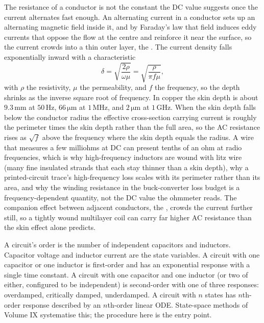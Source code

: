 \begin{mastery}
The resistance of a conductor is not the constant the DC value suggests once the
current alternates fast enough. An alternating current in a conductor sets up an
alternating magnetic field inside it, and by Faraday's law that field induces
eddy currents that oppose the flow at the centre and reinforce it near the
surface, so the current crowds into a thin outer layer, the . The current density falls exponentially inward with a characteristic
\[
\delta = \sqrt{\frac{2\rho}{\omega\mu}}
= \sqrt{\frac{\rho}{\pi f\mu}},
\]
with $\rho$ the resistivity, $\mu$ the permeability, and $f$ the frequency, so
the depth shrinks as the inverse square root of frequency. In copper the skin
depth is about $9.3\,\si{\milli\meter}$ at $50\,\si{\hertz}$, $66\,\si{\micro
\meter}$ at $1\,\si{\mega\hertz}$, and $2\,\si{\micro\meter}$ at
$1\,\si{\giga\hertz}$. When the skin depth falls below the conductor radius the
effective cross-section carrying current is roughly the perimeter times the skin
depth rather than the full area, so the AC resistance rises as $\sqrt{f}$ above
the frequency where the skin depth equals the radius. A wire that measures a few
milliohms at DC can present tenths of an ohm at radio frequencies, which is why
high-frequency inductors are wound with litz wire (many fine insulated strands
that each stay thinner than a skin depth), why a printed-circuit trace's
high-frequency loss scales with its perimeter rather than its area, and why the
winding resistance in the buck-converter loss budget is a frequency-dependent
quantity, not the DC value the ohmmeter reads. The companion effect between
adjacent conductors, the , crowds the current further
still, so a tightly wound multilayer coil can carry far higher AC resistance
than the skin effect alone predicts.
\end{mastery}

\begin{principle}
A circuit's order is the number of independent capacitors and
inductors. Capacitor voltage and inductor current are the state
variables. A circuit with one capacitor or one inductor is first-order
and has an exponential response with a single time constant. A circuit
with one capacitor and one inductor (or two of either, configured to
be independent) is second-order with one of three responses:
overdamped, critically damped, underdamped. A circuit with $n$
states has $n$th-order response described by an $n$th-order linear
ODE. State-space methods of Volume IX systematise this; the procedure
here is the entry point.
\end{principle}

